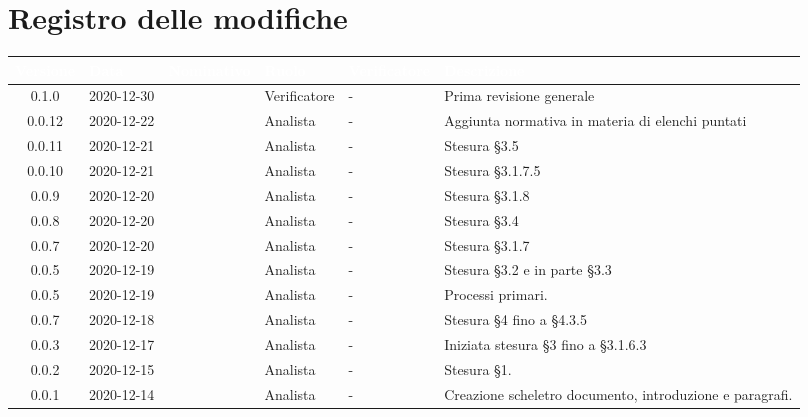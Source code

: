 \section*{Registro delle modifiche}
\setcounter{table}{-1}
{

\renewcommand{\arraystretch}{1.5}
\centering
\begin{longtable}{c C{2.6cm} C{2.6cm} C{2.6cm} C{2.6cm} C{3.5cm}}
\textcolor{white}{\textbf{Versione}}&
\textcolor{white}{\textbf{Data}}&
\textcolor{white}{\textbf{Nominativo}}&
\textcolor{white}{\textbf{Ruolo}}&
\textcolor{white}{\textbf{Verificatore}}&
\textcolor{white}{\textbf{Descrizione}}\\	
\endhead

0.1.0 & 2020-12-30 & \SP{} & Verificatore & - & Prima revisione generale\\
0.0.12 & 2020-12-22 & \PA{} & Analista & - & Aggiunta normativa in materia di elenchi puntati \\
0.0.11 & 2020-12-21 & \RA{} & Analista & - & Stesura \S 3.5 \\
0.0.10 & 2020-12-21 & \PA{} & Analista & - & Stesura \S 3.1.7.5 \\
0.0.9 & 2020-12-20 & \PA{} & Analista & - & Stesura \S 3.1.8 \\
0.0.8 & 2020-12-20 & \RA{} & Analista & - & Stesura \S 3.4 \\
0.0.7 & 2020-12-20 & \PA{} & Analista & - & Stesura \S 3.1.7 \\
0.0.5 & 2020-12-19 & \RA{} & Analista & - & Stesura \S 3.2 e in parte \S 3.3 \\
0.0.5 & 2020-12-19 & \ZM{} & Analista & - & Processi primari. \\
0.0.7 & 2020-12-18 & \SH{} & Analista & - & Stesura \S 4 fino a \S 4.3.5\\
0.0.3 & 2020-12-17 & \PA{} & Analista & - & Iniziata stesura \S 3 fino a \S 3.1.6.3 \\
0.0.2 & 2020-12-15 & \PA{} & Analista & - & Stesura \S 1. \\
0.0.1 & 2020-12-14 & \ZM{} & Analista & - & Creazione scheletro documento, introduzione e paragrafi. \\
		
\end{longtable}
}
